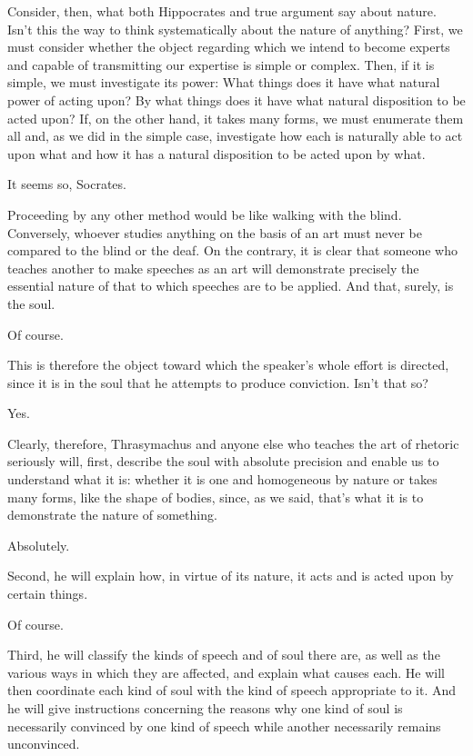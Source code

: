 \saysocrates Consider, then, what both Hippocrates and true argument say
about nature. Isn’t this the way to think systematically about the
nature of anything? First, we must consider whether the object
regarding which we intend to become experts and capable of transmitting
our expertise is simple or complex. Then, if it is simple, we must
investigate its power: What things does it have what natural power of
acting upon? By what things does it have what natural disposition to be
acted upon? If, on the other hand, it takes many forms, we must
enumerate them all and, as we did in the simple case, investigate how
each is naturally able to act upon what and how it has a natural
disposition to be acted upon by what.

\sayphaedrus It seems so, Socrates.

\saysocrates Proceeding by any other method would be like walking with 
the blind. Conversely, whoever studies anything on the basis of
an art must never be compared to the blind or the deaf. On the contrary,
it is clear that someone who teaches another to make speeches as an art
will demonstrate precisely the essential nature of that to which
speeches are to be applied. And that, surely, is the soul.

\sayphaedrus Of course.

\saysocrates This is therefore the object toward which the speaker’s whole effort is directed, since it is in the soul that he
attempts to produce conviction. Isn’t that so?

\sayphaedrus Yes.

\saysocrates Clearly, therefore, Thrasymachus and anyone else who teaches
the art of rhetoric seriously will, first, describe the soul with
absolute precision and enable us to understand what it is: whether it is
one and homogeneous by nature or takes many forms, like the shape of
bodies, since, as we said, that’s what it is to demonstrate the nature
of something.

\sayphaedrus Absolutely.

\saysocrates Second, he will explain how, in virtue of its nature, it acts
and is acted upon by certain things.

\sayphaedrus Of course.

\saysocrates Third, he will classify the kinds of speech and of
soul there are, as well as the various ways in which they are affected,
and explain what causes each. He will then coordinate each kind of soul
with the kind of speech appropriate to it. And he will give instructions
concerning the reasons why one kind of soul is necessarily convinced by
one kind of speech while another necessarily remains unconvinced.

